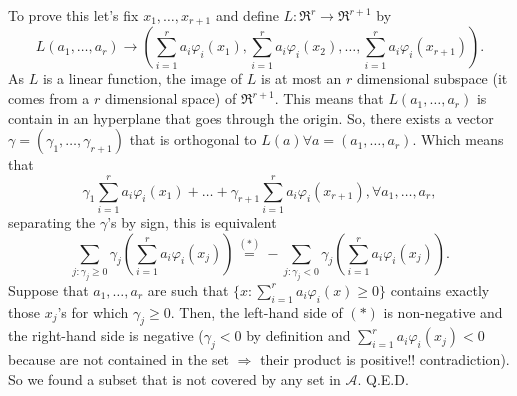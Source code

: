 \documentclass[11pt, english]{article}
\newcommand{\su}[2]{\sum\limits_{#1}^{#2}}
\begin{document}
To prove this let's fix $x_1,\dots,x_{r+1}$ and define $L:\Re^r\rightarrow\Re^{r+1}$ by 
\begin{equation}
L(a_1,\dots,a_r)\rightarrow\left(\su{i=1}{r}a_i\varphi_i(x_1),\su{i=1}{r}a_i\varphi_i(x_2),\dots,\su{i=1}{r}a_i\varphi_i(x_{r+1})\right). 
\end{equation}
As $L$ is a linear function, the image of $L$ is at most an $r$ dimensional subspace (it comes from a $r$ dimensional space) of $\Re^{r+1}$. This means that $L(a_1,\dots,a_r)$ is contain in an hyperplane that goes through the origin. So, there exists a vector $\gamma=(\gamma_1,\dots,\gamma_{r+1})$ that is orthogonal to $L(a)\forall a=(a_1,\dots,a_r)$. Which means that
\begin{equation}
	\gamma_1\su{i=1}{r}a_i\varphi_i(x_1)+\dots+\gamma_{r+1}\su{i=1}{r}a_i\varphi_i(x_{r+1}),\forall a_1,\dots,a_r,
\end{equation}
separating the $\gamma$'s by sign, this is equivalent 
\begin{equation}
	\su{j:\gamma_j\geq 0}{}\gamma_j(\su{i=1}{r}a_i\varphi_i(x_j))\overset{(*)}{=}-\su{j:\gamma_j<0}{}\gamma_j(\su{i=1}{r}a_i\varphi_i(x_j)).
\end{equation}
Suppose that $a_1,\dots,a_r$ are such that $\{x:\su{i=1}{r}a_i\varphi_i(x)\geq0\}$ contains exactly those $x_j$'s for which $\gamma_j\geq 0$. Then, the left-hand side of $(*)$ is non-negative and the right-hand side is negative ($\gamma_j<0$ by definition and $\su{i=1}{r}a_i\varphi_i(x_j)<0$ because are not contained in the set $\Rightarrow$ their product is positive!! contradiction). So we found a subset that is not covered by any set in $\mathcal{A}$. Q.E.D.\\
\end{document}
